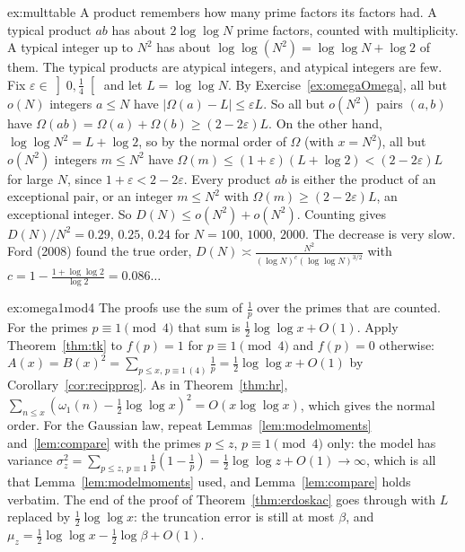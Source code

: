 \begin{solution}{ex:multtable}
\idea A product remembers how many prime factors its factors had. A typical product $ab$ has about $2\log\log N$ prime factors, counted with multiplicity. A typical integer up to $N^2$ has about $\log\log(N^2)=\log\log N+\log2$ of them. The typical products are atypical integers, and atypical integers are few.
\writeup Fix $\varepsilon\in\left]0,\frac14\right[$ and let $L=\log\log N$. By Exercise~\ref{ex:omegaOmega}, all but $o(N)$ integers $a\le N$ have $|\Omega(a)-L|\le\varepsilon L$. So all but $o(N^2)$ pairs $(a,b)$ have
$\Omega(ab)=\Omega(a)+\Omega(b)\ge(2-2\varepsilon)L$. On the other hand, $\log\log N^2=L+\log2$, so by the normal order of $\Omega$ (with $x=N^2$), all but $o(N^2)$ integers $m\le N^2$ have $\Omega(m)\le(1+\varepsilon)(L+\log2)<(2-2\varepsilon)L$ for large $N$, since $1+\varepsilon<2-2\varepsilon$.
Every product $ab$ is either the product of an exceptional pair, or an integer $m\le N^2$ with $\Omega(m)\ge(2-2\varepsilon)L$, an exceptional integer. So $D(N)\le o(N^2)+o(N^2)$.
Counting gives $D(N)/N^2=0.29$, $0.25$, $0.24$ for $N=100$, $1000$, $2000$. The decrease is very slow. Ford (2008) found the true order, $D(N)\asymp\frac{N^2}{(\log N)^c(\log\log N)^{3/2}}$ with $c=1-\frac{1+\log\log2}{\log2}=0.086\ldots$
\end{solution}

\begin{solution}{ex:omega1mod4}
\idea The proofs use the sum of $\frac1p$ over the primes that are counted. For the primes $p\equiv1\pmod4$ that sum is $\frac12\log\log x+O(1)$.
\writeup Apply Theorem~\ref{thm:tk} to $f(p)=1$ for $p\equiv1\pmod4$ and $f(p)=0$ otherwise: $A(x)=B(x)^2=\sum_{p\le x,\,p\equiv1\,(4)}\frac1p=\frac12\log\log x+O(1)$ by Corollary~\ref{cor:recipprog}. As in Theorem~\ref{thm:hr},
$\sum_{n\le x}(\omega_1(n)-\frac12\log\log x)^2=O(x\log\log x)$, which gives the normal order. For the Gaussian law, repeat Lemmas~\ref{lem:modelmoments} and~\ref{lem:compare} with the primes $p\le z$, $p\equiv1\pmod4$ only:
the model has variance $\sigma_z^2=\sum_{p\le z,\,p\equiv1}\frac1p(1-\frac1p)=\frac12\log\log z+O(1)\to\infty$, which is all that Lemma~\ref{lem:modelmoments} used, and Lemma~\ref{lem:compare} holds verbatim. The end of the proof of
Theorem~\ref{thm:erdoskac} goes through with $L$ replaced by $\frac12\log\log x$: the truncation error is still at most $\beta$, and $\mu_z=\frac12\log\log x-\frac12\log\beta+O(1)$.
\end{solution}

